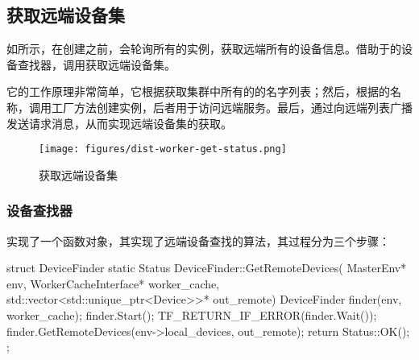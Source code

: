 \begin{content}
\subsection{获取远端设备集}

如所示，在创建之前，会轮询所有的实例，获取远端所有的设备信息。借助于的设备查找器，调用获取远端设备集。

它的工作原理非常简单，它根据获取集群中所有的的名字列表；然后，根据的名称，调用工厂方法创建实例，后者用于访问远端服务。最后，通过向远端列表广播发送请求消息，从而实现远端设备集的获取。

\begin{figure}[H]
\centering
\texttt{[image: figures/dist-worker-get-status.png]}
\caption{获取远端设备集}
 \label{fig:dist-worker-get-status}
\end{figure}

\subsubsection{设备查找器}

实现了一个函数对象，其实现了远端设备查找的算法，其过程分为三个步骤：

\begin{enum}
\end{enum}

\begin{leftbar}
\begin{c++}
struct DeviceFinder {
  static Status DeviceFinder::GetRemoteDevices(
      MasterEnv* env,
      WorkerCacheInterface* worker_cache,
      std::vector<std::unique_ptr<Device>>* out_remote) {
    DeviceFinder finder(env, worker_cache);
    finder.Start();
    TF_RETURN_IF_ERROR(finder.Wait());
    finder.GetRemoteDevices(env->local_devices, out_remote);
    return Status::OK();
  }
};
\end{c++}
\end{leftbar}


\end{content}
